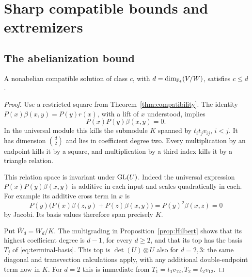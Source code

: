 \section{Sharp compatible bounds and extremizers}
\label{sec:compatible-bounds}

\subsection{The abelianization bound}

\begin{lemma}\label{lem:compatible-d}
A nonabelian compatible solution of class \(c\), with
\(d=\dim_{\mathbb F_4}(V/W)\), satisfies \(c\le d\).
\end{lemma}
\begin{proof}
Use a restricted square from Theorem~\ref{thm:compatibility}.
The identity
\(P(x)\beta(x,y)=P(y)r(x)\), with a lift of \(x\) understood,
implies
\begin{equation}\label{eq:double-endpoint}
 P(x)P(y)\beta(x,y)=0.
\end{equation}
In the universal module this kills the submodule \(K\) spanned by
\(t_it_jv_{ij}\), \(i<j\).
It has dimension \(\binom d2\) and lies in coefficient degree two.
Every multiplication by an endpoint kills it by a square, and
multiplication by a third index kills it by a triangle relation.

This relation space is invariant under \(\operatorname{GL}(U)\).
Indeed the universal expression
\(P(x)P(y)\beta(x,y)\) is additive in each input and scales
quadratically in each. For example its additive cross term in \(x\)
is
\[
 P(y)\bigl(P(x)\beta(z,y)+P(z)\beta(x,y)\bigr)
       =P(y)^2\beta(x,z)=0
\]
by Jacobi. Its basis values therefore span precisely \(K\).

Put \(\overline W_d=W_d/K\). The multigrading in
Proposition~\ref{prop:Hilbert} shows that its highest coefficient degree
is \(d-1\), for every \(d\ge2\), and that its top has the basis
\(T_j\) of \eqref{eq:terminal-basis}.
This top is \(\det(U)\otimes U\) also for \(d=2,3\): the same
diagonal and transvection calculations apply, with any additional
double-endpoint term now in \(K\). For \(d=2\) this is immediate
from \(T_1=t_1v_{12},T_2=t_2v_{12}\).


\end{proof}
